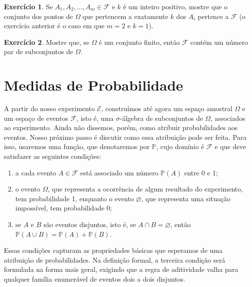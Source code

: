 \documentclass[12pt,portuguese]{article}
\theoremstyle{definition}
\newtheorem{exercise}{Exercício}
\begin{document}
\begin{exercise}\label{exercise:1.11}
Se \(A_1, A_2, \dots, A_m \in \mathcal{F}\) e \(k\) é um inteiro positivo,
mostre que o conjunto dos pontos de \(\Omega\) que pertencem a exatamente
\(k\) dos \(A_i\) pertence a \(\mathcal{F}\) (o exercício anterior é o caso
em que \(m = 2\) e \(k = 1\)).
\end{exercise}

\begin{exercise}\label{exercise:1.12}
Mostre que, se \(\Omega\) é um conjunto finito, então \(\mathcal{F}\) contém
um número par de subconjuntos de \(\Omega\).
\end{exercise}

\section{Medidas de Probabilidade}

A partir do nosso experimento \(\mathcal{E}\), construímos até agora um espaço
amostral \(\Omega\) e um espaço de eventos \(\mathcal{F}\), isto é, uma
\(\sigma\)-álgebra de subconjuntos de \(\Omega\), associados ao experimento.
Ainda não dissemos, porém, como atribuir probabilidades aos eventos.
Nosso próximo passo é discutir como essa atribuição pode ser feita.
Para isso, usaremos uma função, que denotaremos por \(\mathbb{P}\), cujo
domínio é \(\mathcal{F}\) e que deve satisfazer as seguintes condições:

\begin{enumerate}[label=(\alph*), ref=\alph*]
\item a cada evento \(A \in \mathcal{F}\) está associado um número
\(\mathbb{P}(A)\) entre 0 e 1;
\item o evento \(\Omega\), que representa a ocorrência de algum resultado
do experimento, tem probabilidade 1, enquanto o evento \(\varnothing\),
que representa uma situação impossível, tem probabilidade 0;
\item se \(A\) e \(B\) são eventos disjuntos, isto é, se \(A \cap B =
\varnothing\), então
\(\mathbb{P}(A \cup B) = \mathbb{P}(A) + \mathbb{P}(B)\).
\end{enumerate}

Essas condições capturam as propriedades básicas que esperamos de uma
atribuição de probabilidades. Na definição formal, a terceira condição será
formulada na forma mais geral, exigindo que a regra de aditividade valha para
qualquer família enumerável de eventos dois a dois disjuntos.
\end{document}

